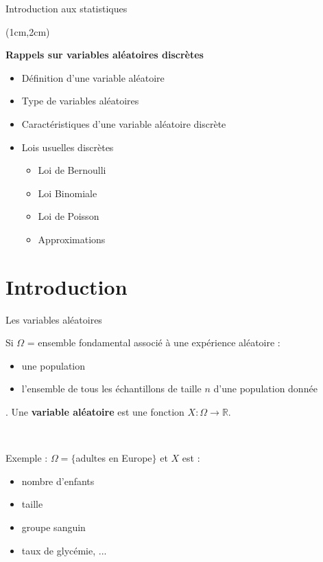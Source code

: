 \documentclass{beamer}
\begin{document}



\begin{frame}{Introduction aux statistiques}
\begin{textblock*}{\textwidth}(1cm,2cm)

\begin{center}{\bf \Large Rappels sur variables aléatoires discrètes} \end{center}
\vspace{0.3cm}
\begin{itemize}
\item Définition d'une variable aléatoire 
\item Type de variables aléatoires
\item Caractéristiques d'une variable aléatoire discrète
\item Lois usuelles discrètes 
\begin{itemize}
\item Loi de Bernoulli
\item Loi Binomiale
\item Loi de Poisson
\item Approximations
\end{itemize}
\end{itemize}

 \end{textblock*}

\end{frame}

\section{Introduction}
\begin{frame}{Les variables aléatoires}

Si $\Omega $  = ensemble fondamental  associé à une expérience aléatoire :
\begin{itemize}
\item une population 
\item l'ensemble de tous les échantillons de taille $n$ d'une population donnée
\end{itemize}.
Une {\bf variable aléatoire} est une fonction $X:\Omega \longrightarrow \mathbb{R}$.

\

Exemple : $\Omega=\{ $adultes en Europe$\}$ et $X$ est :
\begin{itemize}
\item nombre d'enfants
\item taille
\item groupe sanguin
\item taux de glycémie, ...
\end{itemize} 
\end{frame}
\end{document}
